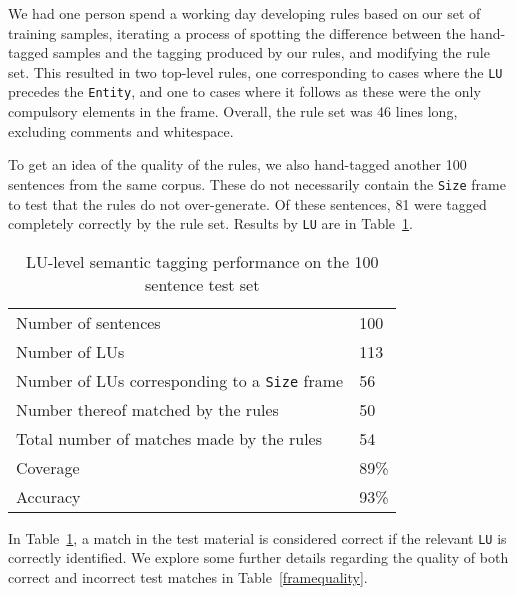 \documentclass{llncs}
\begin{document}
We had one person spend a working day developing rules based on our set of training samples, iterating a process
of spotting the difference between the hand-tagged samples and the
tagging produced by our rules, and modifying the rule set. This  resulted
in two top-level rules, one corresponding to cases where the \verb+LU+ precedes
the \verb+Entity+, and one to cases where it follows as these were the only
compulsory elements in the frame. Overall, the rule set was 46 lines long, excluding comments and whitespace.

To get an idea of the quality of the rules, we also hand-tagged another 100 sentences from the same corpus. 
These do not necessarily contain the \verb+Size+ frame to test that the rules do not over-generate.
Of these sentences, 81 were tagged completely correctly by the rule set. Results by \verb+LU+ are in
Table~\ref{luperf}.

\begin{table}[h]
  \centering
  \begin{tabular}{l | l}
    \hline
    Number of sentences & 100 \\
    Number of LUs & 113 \\
    Number of LUs corresponding to a \verb+Size+ frame & 56 \\ %
    Number thereof matched by the rules & 50 \\
    Total number of matches made by the rules & 54 \\
    \hline
    Coverage & 89\% \\
    Accuracy & 93\% \\
    \hline
  \end{tabular}
  \caption{LU-level semantic tagging performance on the 100 sentence test set}
  \label{luperf}
\end{table}

In Table~\ref{luperf}, a match in the test material is considered correct if the relevant \verb+LU+
is correctly identified. We explore some further details regarding the quality of both
correct and incorrect test matches in Table~\ref{framequality}.
\end{document}
